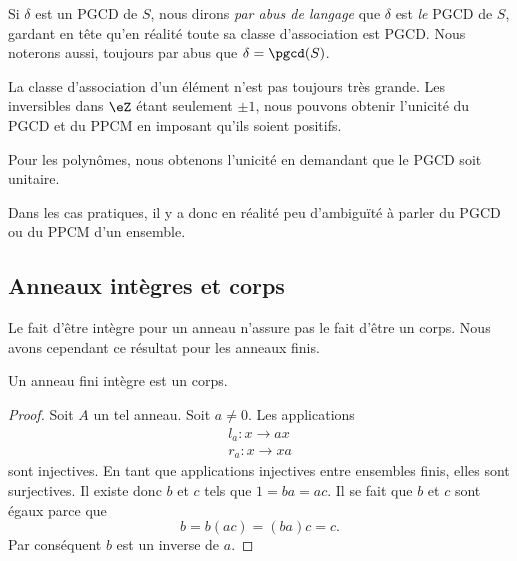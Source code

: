 Si \( \delta\) est un PGCD de \( S\), nous dirons \emph{par abus de langage} que \( \delta\) est \emph{le} PGCD de \( S\), gardant en tête qu'en réalité toute sa classe d'association est PGCD. Nous noterons aussi, toujours par abus que \( \delta=\pgcd(S)\).

\begin{remark}
    La classe d'association d'un élément n'est pas toujours très grande. Les inversibles dans \( \eZ\) étant seulement \( \pm 1\), nous pouvons obtenir l'unicité du PGCD et du PPCM en imposant qu'ils soient positifs.

    Pour les polynômes, nous obtenons l'unicité en demandant que le PGCD soit unitaire.

    Dans les cas pratiques, il y a donc en réalité peu d'ambiguïté à parler du PGCD ou du PPCM d'un ensemble.
\end{remark}


\subsection{Anneaux intègres et corps}


Le fait d'être intègre pour un anneau n'assure pas le fait d'être un corps. Nous avons cependant ce résultat pour les anneaux finis.

\begin{proposition}     \label{PropanfinintimpCorp}
    Un anneau fini intègre est un corps.
\end{proposition}

\begin{proof}
    Soit \( A\) un tel anneau. Soit \( a\neq 0\). Les applications 
    \begin{subequations}
        \begin{align}
            l_a\colon x\to ax\\
            r_a\colon x\to xa
        \end{align}
    \end{subequations}
    sont injectives. En tant que applications injectives entre ensembles finis, elles sont surjectives. Il existe donc \( b\) et \( c\) tels que \( 1=ba=ac\). Il se fait que \( b\) et \( c\) sont égaux parce que
    \begin{equation}
        b=b(ac)=(ba)c=c.
    \end{equation}
    Par conséquent \( b\) est un inverse de \( a\).
\end{proof}


